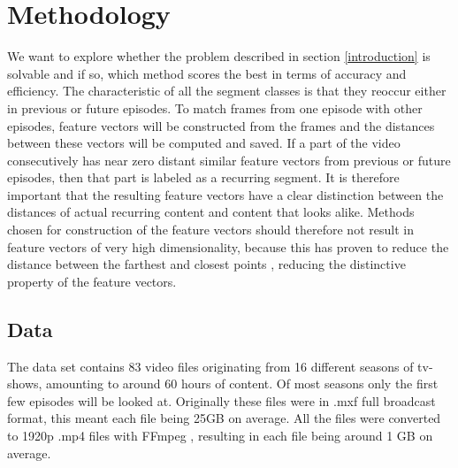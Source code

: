 \documentclass{article}
\begin{document}
\cite{gauch2006finding} %
\cite{wang2008multimodal} %

\cite{herley2006argos} %
\cite{berrani2008non} %

\cite{benezeth2010unsupervised} %
\cite{ibrahim2011tv} %
\cite{abduraman2011unsupervised} %
\fi


\section{Methodology} \label{methodology}
We want to explore whether the problem described in section \ref{introduction} is solvable and if so, which method scores the best in terms of accuracy and efficiency. The characteristic of all the segment classes is that they reoccur either in previous or future episodes. To match frames from one episode with other episodes, feature vectors will be constructed from the frames and the distances between these vectors will be computed and saved. If a part of the video consecutively has near zero distant similar feature vectors from previous or future episodes, then that part is labeled as a recurring segment. It is therefore important that the resulting feature vectors have a clear distinction between the distances of actual recurring content and content that looks alike. Methods chosen for construction of the feature vectors should therefore not result in feature vectors of very high dimensionality, because this has proven to reduce the distance between the farthest and closest points \cite{beyer1999nearest}, reducing the distinctive property of the feature vectors. 

\subsection{Data}
The data set contains 83 video files originating from 16 different seasons of tv-shows, amounting to around 60 hours of content. Of most seasons only the first few episodes will be looked at. Originally these files were in .mxf full broadcast format, this meant each file being 25GB on average. All the files were converted to 1920p .mp4 files with FFmpeg \cite{ffmpeg}, resulting in each file being around 1 GB on average.
\end{document}

